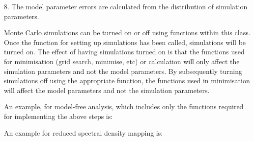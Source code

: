 8.  The model parameter errors are calculated from the distribution of simulation
parameters.


Monte Carlo simulations can be turned on or off using functions within this class.  Once the
function for setting up simulations has been called, simulations will be turned on.  The
effect of having simulations turned on is that the functions used for minimisation  (grid
search, minimise,  etc) or calculation will only affect the simulation parameters and not the
model parameters.  By subsequently turning simulations off using the appropriate function,
the functions used in minimisation  will affect the model parameters and not the simulation
parameters.


An example, for model-free analysis, which includes only the functions required for
implementing the above steps is:










An example for reduced spectral density mapping  is:





